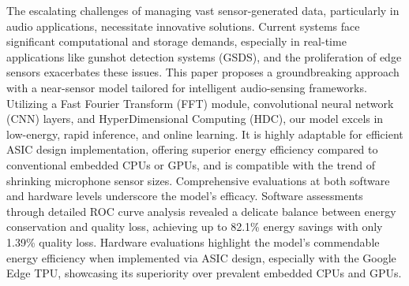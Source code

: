 The escalating challenges of managing vast sensor-generated data, particularly in audio applications, necessitate innovative solutions. Current systems face significant computational and storage demands, especially in real-time applications like gunshot detection systems (GSDS), and the proliferation of edge sensors exacerbates these issues. This paper proposes a groundbreaking approach with a near-sensor model tailored for intelligent audio-sensing frameworks. Utilizing a Fast Fourier Transform (FFT) module, convolutional neural network (CNN) layers, and HyperDimensional Computing (HDC), our model excels in low-energy, rapid inference, and online learning. It is highly adaptable for efficient ASIC design implementation, offering superior energy efficiency compared to conventional embedded CPUs or GPUs, and is compatible with the trend of shrinking microphone sensor sizes. Comprehensive evaluations at both software and hardware levels underscore the model's efficacy. Software assessments through detailed ROC curve analysis revealed a delicate balance between energy conservation and quality loss, achieving up to 82.1\% energy savings with only 1.39\% quality loss. Hardware evaluations highlight the model's commendable energy efficiency when implemented via ASIC design, especially with the Google Edge TPU, showcasing its superiority over prevalent embedded CPUs and GPUs.